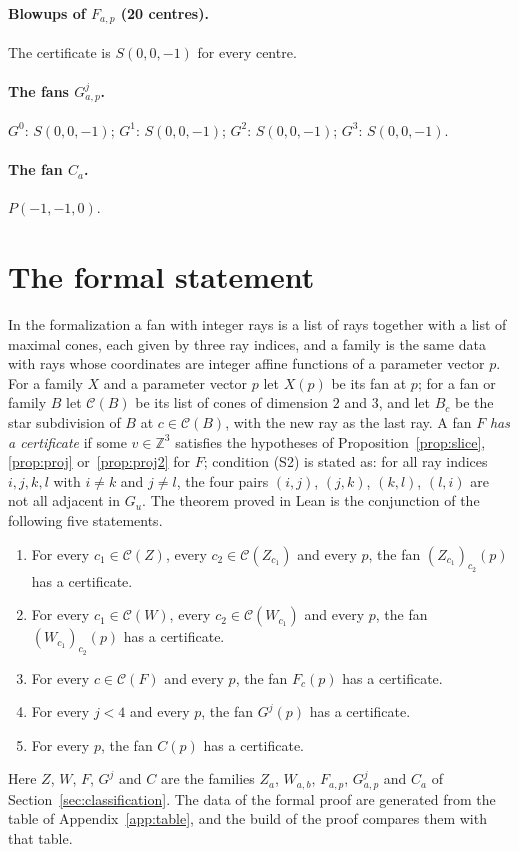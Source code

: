 \documentclass[12pt]{article}
\newcommand{\Z}{\mathbb{Z}}
\begin{document}
{\paragraph{Blowups of $F_{a,p}$ (20 centres).} The certificate is $S(0,0,-1)$ for every centre.
\paragraph{The fans $G^j_{a,p}$.} $G^0$: $S(0,0,-1)$; $G^1$: $S(0,0,-1)$; $G^2$: $S(0,0,-1)$; $G^3$: $S(0,0,-1)$.
\paragraph{The fan $C_a$.} $P(-1,-1,0)$.
}

\section{The formal statement}\label{app:lean}

In the formalization a fan with integer rays is a list of rays together with a list of maximal cones, each given by three ray indices, and a family is the same data with rays whose coordinates are integer affine functions of a parameter vector $p$. For a family $X$ and a parameter vector $p$ let $X(p)$ be its fan at $p$; for a fan or family $B$ let $\mathcal{C}(B)$ be its list of cones of dimension $2$ and $3$, and let $B_c$ be the star subdivision of $B$ at $c\in\mathcal{C}(B)$, with the new ray as the last ray. A fan $F$ \emph{has a certificate} if some $v\in\Z^3$ satisfies the hypotheses of Proposition~\ref{prop:slice}, \ref{prop:proj} or~\ref{prop:proj2} for $F$; condition (S2) is stated as: for all ray indices $i,j,k,l$ with $i\ne k$ and $j\ne l$, the four pairs $(i,j)$, $(j,k)$, $(k,l)$, $(l,i)$ are not all adjacent in $G_u$. The theorem proved in Lean is the conjunction of the following five statements.
\begin{enumerate}
\item For every $c_1\in\mathcal{C}(Z)$, every $c_2\in\mathcal{C}(Z_{c_1})$ and every $p$, the fan $(Z_{c_1})_{c_2}(p)$ has a certificate.
\item For every $c_1\in\mathcal{C}(W)$, every $c_2\in\mathcal{C}(W_{c_1})$ and every $p$, the fan $(W_{c_1})_{c_2}(p)$ has a certificate.
\item For every $c\in\mathcal{C}(F)$ and every $p$, the fan $F_c(p)$ has a certificate.
\item For every $j<4$ and every $p$, the fan $G^j(p)$ has a certificate.
\item For every $p$, the fan $C(p)$ has a certificate.
\end{enumerate}
Here $Z$, $W$, $F$, $G^j$ and $C$ are the families $Z_a$, $W_{a,b}$, $F_{a,p}$, $G^j_{a,p}$ and $C_a$ of Section~\ref{sec:classification}. The data of the formal proof are generated from the table of Appendix~\ref{app:table}, and the build of the proof compares them with that table.
\end{document}
